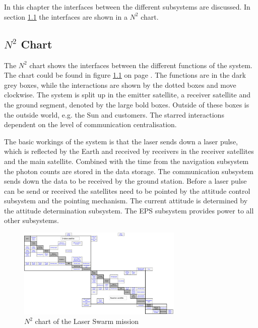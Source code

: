 \chapter{}
In this chapter the interfaces between the different subsystems are discussed. In section \ref{sec:n2chart} the interfaces are shown in a $N^2$ chart. 

\section{$N^2$ Chart}
\label{sec:n2chart}
The $N^2$ chart shows the interfaces between the different functions of the system. The chart could be found in figure \ref{fig:n2chart} on page \pageref{fig:n2chart}. The functions are in the dark grey boxes, while the interactions are shown by the dotted boxes and move clockwise. The system is split up in the emitter satellite, a receiver satellite and the ground segment, denoted by the large bold boxes. Outside of these boxes is the outside world, e.g. the Sun and customers. The starred interactions dependent on the level of communication centralisation.

The basic workings of the system is that the laser sends down a laser pulse, which is reflected by the Earth and received by receivers in the receiver satellites and the main satellite. Combined with the time from the navigation subsystem the photon counts are stored in the data storage. The communication subsystem sends down the data to be received by the ground station. Before a laser pulse can be send or received the satellites need to be pointed by the attitude control subsystem and the pointing mechanism. The current attitude is determined by the attitude determination subsystem. The \ac{EPS} subsystem provides power to all other subsystems. 

\begin{figure}
\centering
\includegraphics[angle = 90, width = 0.7\textwidth, bb= 0 0 3421px 1861px]{img/N2chart_wo.png} 
\caption{$N^2$ chart of the Laser Swarm mission}
\label{fig:n2chart}
\end{figure}